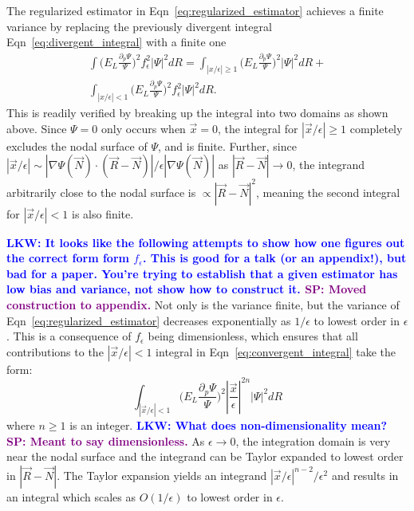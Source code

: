 \documentclass[twocolumn]{revtex4-1}
\newcommand{\lucas}[1]{\textbf{\textcolor{blue}{LKW: #1}}}
\newcommand{\shivesh}[1]{\textbf{\textcolor{purple}{SP: #1}}}
\begin{document}
The regularized estimator in Eqn~\ref{eq:regularized_estimator} achieves a finite variance by replacing the previously divergent integral Eqn~\ref{eq:divergent_integral} with a finite one
\begin{equation}
\begin{split}
\int \Big(E_L\frac{\partial_p\Psi}{\Psi}\Big)^2 f_\epsilon^2 |\Psi|^2 dR = \int_{|x/\epsilon|\geq 1} \Big(E_L\frac{\partial_p\Psi}{\Psi}\Big)^2 |\Psi|^2 dR +\\ \int_{|x/\epsilon|< 1} \Big(E_L\frac{\partial_p\Psi}{\Psi}\Big)^2 f_\epsilon^2 |\Psi|^2 dR.
\end{split}
\label{eq:convergent_integral}
\end{equation}
This is readily verified by breaking up the integral into two domains as shown above.
Since $\Psi = 0$ only occurs when $\vec{x} = 0$, the integral for $|\vec{x}/\epsilon|\geq 1$ completely excludes the nodal surface of $\Psi$, and is finite. 
Further, since $|\vec{x}/\epsilon| \sim |\nabla\Psi(\vec{N}) \cdot (\vec{R}-\vec{N})|/\epsilon|\nabla  \Psi(\vec{N})|$ as $|\vec{R} - \vec{N}| \rightarrow 0$, the integrand arbitrarily close to the nodal surface is $\propto |\vec{R} - \vec{N}|^2$, meaning the second integral for $|\vec{x}/\epsilon| < 1$ is also finite.

\lucas{It looks like the following attempts to show how one figures out the correct form form $f_\epsilon$. This is good for a talk (or an appendix!), but bad for a paper. You're trying to establish that a given estimator has low bias and variance, not show how to construct it. }
\shivesh{Moved construction to appendix.}
Not only is the variance finite, but the variance of Eqn~\ref{eq:regularized_estimator} decreases exponentially as $1/\epsilon$ to lowest order in $\epsilon$.
This is a consequence of $f_\epsilon$ being dimensionless, which ensures that all contributions to the $|\vec{x}/\epsilon|< 1$ integral in Eqn~\ref{eq:convergent_integral} take the form:
\begin{equation}
\int_{|\vec{x}/\epsilon|< 1} \Big(E_L\frac{\partial_p\Psi}{\Psi}\Big)^2 |\frac{\vec{x}}{\epsilon}|^{2n} |\Psi|^2 dR
\end{equation} 
where $n \geq 1$ is an integer.
\lucas{What does non-dimensionality mean?} \shivesh{Meant to say dimensionless.}
As $\epsilon \rightarrow 0$, the integration domain is very near the nodal surface and the integrand can be Taylor expanded to lowest order in $|\vec{R}-\vec{N}|$. 
The Taylor expansion yields an integrand $|\vec{x}/\epsilon|^{n-2}/\epsilon^2$ and results in an integral which scales as $O(1/\epsilon)$ to lowest order in $\epsilon$.
\end{document}
